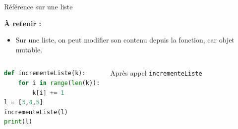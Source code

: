 \documentclass[10pt, xcolor={svgnames}]{beamer}
\begin{document}
\begin{frame}[fragile]{Référence sur une liste}
	
	\begin{block}{}

	\textbf{\`A retenir :}
	
	\begin{itemize}
		\item Sur une liste, on peut modifier son contenu depuis la fonction, car objet mutable. 
	\end{itemize}

	\end{block}
	\vspace{1 cm}
	
	\begin{columns}
		\column{6 cm}
		
		\begin{exampleblock}{}
			\begin{lstlisting}[language=Python]
def incrementeListe(k):
	for i in range(len(k)):
		k[i] += 1
l = [3,4,5]
incrementeListe(l)
print(l)
			\end{lstlisting}
		\end{exampleblock}
		\column{5 cm}
		
		\pause
		\vspace{1 cm}
		Après appel \texttt{incrementeListe}
		
		\vspace{0.3 cm}
		
		
		
	\end{columns}
	
	
	
	
\end{frame}
\end{document}
